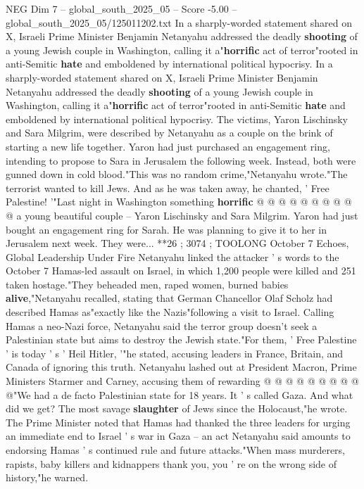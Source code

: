 \begin{textsample}{NEG Dim 7 – global\_south\_2025\_05 – Score -5.00 – global\_south\_2025\_05/125011202.txt}  \label{ex:f7_neg_216}
In a sharply-worded statement shared on X, Israeli Prime Minister Benjamin Netanyahu addressed the deadly \textbf{shooting} of a young Jewish couple in Washington, calling it a"\textbf{horrific} act of terror"rooted in anti-Semitic \textbf{hate} and emboldened by international political hypocrisy.
In a sharply-worded statement shared on X, Israeli Prime Minister Benjamin Netanyahu addressed the deadly \textbf{shooting} of a young Jewish couple in Washington, calling it a"\textbf{horrific} act of terror"rooted in anti-Semitic \textbf{hate} and emboldened by international political hypocrisy.
The victims, Yaron Lischinsky and Sara Milgrim, were described by Netanyahu as a couple on the brink of starting a new life together.
Yaron had just purchased an engagement ring, intending to propose to Sara in Jerusalem the following week.
Instead, both were gunned down in cold blood."This was no random crime,"Netanyahu wrote."The terrorist wanted to kill Jews.
And as he was taken away, he chanted, ' Free Palestine! '"Last night in Washington something \textbf{horrific} @ @ @ @ @ @ @ @ @ @ a young beautiful couple -- Yaron Lischinsky and Sara Milgrim.
Yaron had just bought an engagement ring for Sarah.
He was planning to give it to her in Jerusalem next week.
They were... **26 ; 3074 ; TOOLONG October 7 Echoes, Global Leadership Under Fire Netanyahu linked the attacker ' s words to the October 7 Hamas-led assault on Israel, in which 1,200 people were killed and 251 taken hostage."They beheaded men, raped women, burned babies \textbf{alive},"Netanyahu recalled, stating that German Chancellor Olaf Scholz had described Hamas as"exactly like the Nazis"following a visit to Israel.
Calling Hamas a neo-Nazi force, Netanyahu said the terror group doesn't seek a Palestinian state but aims to destroy the Jewish state."For them, ' Free Palestine ' is today ' s ' Heil Hitler, '"he stated, accusing leaders in France, Britain, and Canada of ignoring this truth.
Netanyahu lashed out at President Macron, Prime Ministers Starmer and Carney, accusing them of rewarding @ @ @ @ @ @ @ @ @ @"We had a de facto Palestinian state for 18 years.
It ' s called Gaza.
And what did we get?
The most savage \textbf{slaughter} of Jews since the Holocaust,"he wrote.
The Prime Minister noted that Hamas had thanked the three leaders for urging an immediate end to Israel ' s war in Gaza -- an act Netanyahu said amounts to endorsing Hamas ' s continued rule and future attacks."When mass murderers, rapists, baby killers and kidnappers thank you, you ' re on the wrong side of history,"he warned.

\end{textsample}
